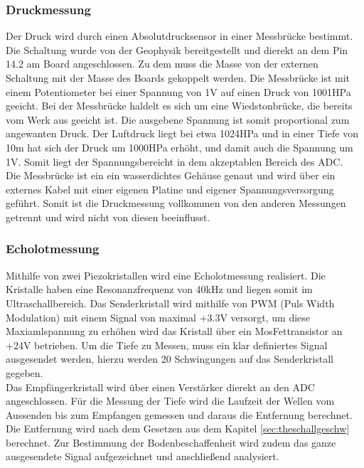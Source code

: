 \documentclass[12pt,a4paper,titlepage,headinclude,bibtotoc]{scrartcl}
\begin{document}
\subsubsection{Druckmessung}
Der Druck wird durch einen Absolutdrucksensor in einer Messbrücke bestimmt.
Die Schaltung wurde von der Geophysik bereitgestellt und dierekt an dem Pin 14.2 am Board angeschlossen.
Zu dem muss die Masse von der externen Schaltung mit der Masse des Boards gekoppelt werden.
Die Messbrücke ist mit einem Potentiometer bei einer Spannung von 1\si{\volt} auf einen Druck von 1001HPa geeicht.
Bei der Messbrücke haldelt es sich um  eine Wiedstonbrücke, die bereits vom Werk aus geeicht ist.
Die ausgebene Spannung ist somit proportional zum angewanten Druck.
Der Luftdruck liegt bei etwa 1024HPa und in einer Tiefe von 10\si{\meter} hat sich der Druck um 1000HPa erhöht, und damit auch die Spannung um 1\si{\volt}.
Somit liegt der Spannungsbereicht in dem akzeptablen Bereich des ADC.\\
Die Messbrücke ist ein ein wasserdichtes Gehäuse genaut und wird über ein externes Kabel mit einer eigenen Platine und eigener Spannungsversorgung geführt.
Somit ist die Druckmessung vollkommen von den anderen Messungen getrennt und wird nicht von diesen beeinflusst.

\subsubsection{Echolotmessung}
Mithilfe von zwei Piezokristallen wird eine Echolotmessung realisiert.
Die Kristalle haben eine Resonanzfrequenz von 40\si{\kilo\hertz} und liegen somit im Ultraschallbereich.
Das Senderkristall wird mithilfe von PWM (Puls Width Modulation) mit einem Signal von maximal +3.3\si{\volt} versorgt, um diese Maxiamlspannung zu erhöhen wird das Kristall über ein MosFettransistor an +24\si{\volt} betrieben.%
Um die Tiefe zu Messen, muss ein klar definiertes Signal ausgesendet werden, hierzu werden 20 Schwingungen auf das Senderkristall gegeben.\\
Das Empfängerkristall wird über einen Verstärker dierekt an den ADC angeschlossen.
Für die Messung der Tiefe wird die Laufzeit der Wellen vom Aussenden bis zum Empfangen gemessen und daraus die Entfernung berechnet.
Die Entfernung wird nach dem Gesetzen aus dem Kapitel \ref{sec:theschallgeschw} berechnet.
Zur Bestimmung der Bodenbeschaffenheit wird zudem das ganze ausgesendete Signal aufgezeichnet und anschließend analysiert.
\end{document}
